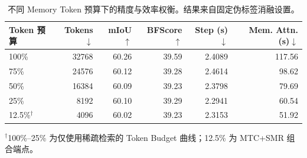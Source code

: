 \begin{table}[t]
  \centering
  \small
  \setlength{\tabcolsep}{3pt}
  \renewcommand{\arraystretch}{1.08}
  \caption{不同 Memory Token 预算下的精度与效率权衡。结果来自固定伪标签消融设置。}
  \label{tab:token_budget}
  \begin{tabular}{lrrrrr}
    \toprule
    Token 预算 & Tokens$\downarrow$ & mIoU$\uparrow$ & BFScore$\uparrow$ & Step (s)$\downarrow$ & Mem. Attn. (s)$\downarrow$ \\
    \midrule
    100\% & 32768 & 60.26 & 39.59 & 2.4089 & 117.56 \\
    75\% & 24576 & 60.12 & 39.28 & 2.4614 & 98.62 \\
    50\% & 16384 & 60.09 & 39.23 & 2.3798 & 79.69 \\
    25\% & 8192 & 60.10 & 39.29 & 2.2941 & 60.54 \\
    12.5\%$^{\dagger}$ & 4096 & 60.02 & 39.23 & 2.3153 & 51.92 \\
    \bottomrule
  \end{tabular}

  \vspace{0.3em}
  \footnotesize{$^{\dagger}$100\%--25\% 为仅使用稀疏检索的 Token Budget 曲线；12.5\% 为 MTC+SMR 组合端点。}
\end{table}
